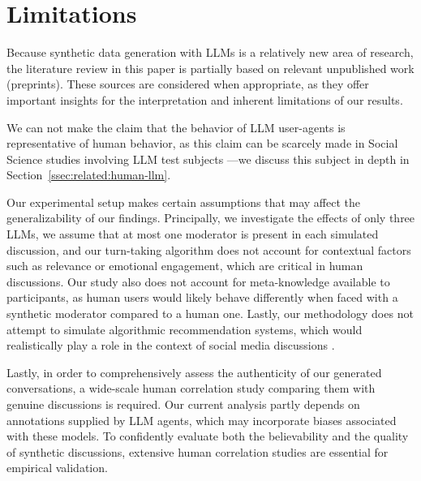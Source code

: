 %
\section{Limitations} 
\label{sec:limitations}

Because synthetic data generation with \acp{LLM} is a relatively new area of research, the literature review in this paper is partially based on relevant unpublished work (preprints). These sources are considered when appropriate, as they offer important insights for the interpretation and inherent limitations of our results.

We can not make the claim that the behavior of \ac{LLM} user-agents is representative of human behavior, as this claim can be scarcely made in Social Science studies involving \ac{LLM} test subjects \cite{rossi_2024, zhou-etal-2024-real}—we discuss this subject in depth in Section~\ref{ssec:related:human-llm}.

Our experimental setup makes certain assumptions that may affect the generalizability of our findings. Principally, we investigate the effects of only three \acp{LLM}, we assume that at most one moderator is present in each simulated discussion, and our turn-taking algorithm does not account for contextual factors such as relevance or emotional engagement, which are critical in human discussions. Our study also does not account for meta-knowledge available to participants, as human users would likely behave differently when faced with a synthetic moderator compared to a human one. Lastly, our methodology does not attempt to simulate algorithmic recommendation systems, which would realistically play a role in the context of social media discussions \cite{y_social}.

Lastly, in order to comprehensively assess the authenticity of our generated conversations, a wide-scale human correlation study comparing them with genuine discussions is required. Our current analysis partly depends on annotations supplied by \ac{LLM} agents, which may incorporate biases associated with these models. To confidently evaluate both the believability and the quality of synthetic discussions, extensive human correlation studies are essential for empirical validation.